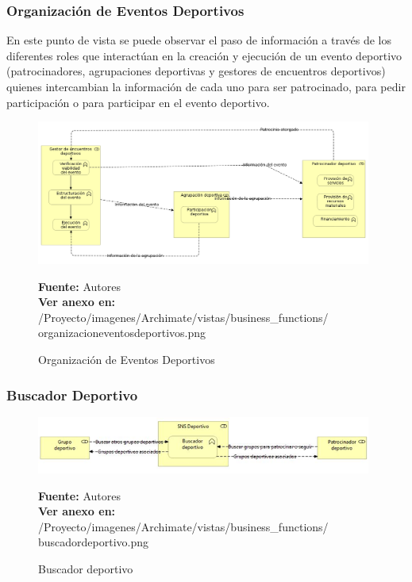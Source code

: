 \subsubsection{Organización de Eventos Deportivos}



En este punto de vista se puede observar el paso de información a través de los diferentes roles que interactúan en la creación y ejecución de un evento deportivo (patrocinadores, agrupaciones deportivas y gestores de encuentros deportivos) quienes intercambian la información de cada uno para ser patrocinado, para pedir participación o para participar en el evento deportivo.

\clearpage

\newpage

\begin{landscape}

\begin{figure}[!htb]
  \begin{center}
    \includegraphics[width=11cm]{./imagenes/Archimate/vistas/business_functions/organizacioneventosdeportivos.png}
    \caption{Organización de Eventos Deportivos}
    \label{fig:bf_organizacion_eventos_deportivos}
    \textbf{Fuente:}  Autores \\
    \textbf{Ver anexo en:} /Proyecto/imagenes/Archimate/vistas/business\_functions/
    organizacioneventosdeportivos.png
  \end{center}
\end{figure}

\end{landscape}

\newpage

\subsubsection{Buscador Deportivo}

\begin{figure}[!htb]
  \begin{center}
    \includegraphics[width=11cm]{./imagenes/Archimate/vistas/business_functions/buscadordeportivo.png}
    \caption{Buscador deportivo}
    \label{fig:BF_BuscadorDeportivo}
    \textbf{Fuente:}  Autores \\
    \textbf{Ver anexo en:} /Proyecto/imagenes/Archimate/vistas/business\_functions/
    buscadordeportivo.png
  \end{center}
\end{figure}

